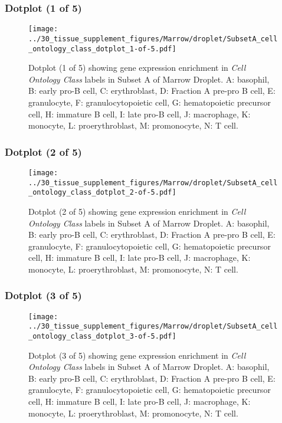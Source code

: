 \clearpage

\subsubsection{Dotplot (1 of 5)}
\begin{figure}[h]
\centering
\texttt{[image: ../30\_tissue\_supplement\_figures/Marrow/droplet/SubsetA\_cell\_ontology\_class\_dotplot\_1-of-5.pdf]}

\caption{ Dotplot (1 of 5)  showing gene expression enrichment in \emph{Cell Ontology Class} labels in Subset A of Marrow Droplet. A: basophil, B: early pro-B cell, C: erythroblast, D: Fraction A pre-pro B cell, E: granulocyte, F: granulocytopoietic cell, G: hematopoietic precursor cell, H: immature B cell, I: late pro-B cell, J: macrophage, K: monocyte, L: proerythroblast, M: promonocyte, N: T cell.}
\end{figure}


\clearpage

\subsubsection{Dotplot (2 of 5)}
\begin{figure}[h]
\centering
\texttt{[image: ../30\_tissue\_supplement\_figures/Marrow/droplet/SubsetA\_cell\_ontology\_class\_dotplot\_2-of-5.pdf]}

\caption{ Dotplot (2 of 5)  showing gene expression enrichment in \emph{Cell Ontology Class} labels in Subset A of Marrow Droplet. A: basophil, B: early pro-B cell, C: erythroblast, D: Fraction A pre-pro B cell, E: granulocyte, F: granulocytopoietic cell, G: hematopoietic precursor cell, H: immature B cell, I: late pro-B cell, J: macrophage, K: monocyte, L: proerythroblast, M: promonocyte, N: T cell.}
\end{figure}


\clearpage

\subsubsection{Dotplot (3 of 5)}
\begin{figure}[h]
\centering
\texttt{[image: ../30\_tissue\_supplement\_figures/Marrow/droplet/SubsetA\_cell\_ontology\_class\_dotplot\_3-of-5.pdf]}

\caption{ Dotplot (3 of 5)  showing gene expression enrichment in \emph{Cell Ontology Class} labels in Subset A of Marrow Droplet. A: basophil, B: early pro-B cell, C: erythroblast, D: Fraction A pre-pro B cell, E: granulocyte, F: granulocytopoietic cell, G: hematopoietic precursor cell, H: immature B cell, I: late pro-B cell, J: macrophage, K: monocyte, L: proerythroblast, M: promonocyte, N: T cell.}
\end{figure}


